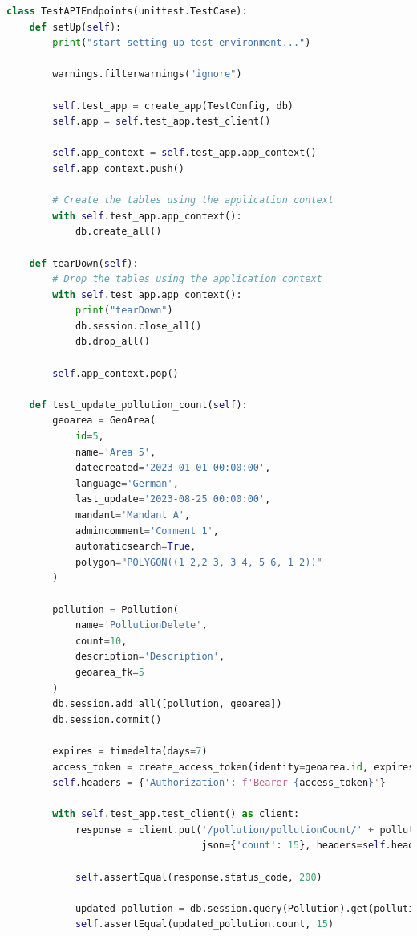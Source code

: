 \documentclass[a4paper,12pt]{article}
\begin{document}
\begin{lstlisting}[language=Python, caption=Implementation der Integrationstests , label=lst:integrationtest]
class TestAPIEndpoints(unittest.TestCase):
    def setUp(self):
        print("start setting up test environment...")

        warnings.filterwarnings("ignore")

        self.test_app = create_app(TestConfig, db)
        self.app = self.test_app.test_client()

        self.app_context = self.test_app.app_context()
        self.app_context.push()

        # Create the tables using the application context
        with self.test_app.app_context():
            db.create_all()

    def tearDown(self):
        # Drop the tables using the application context
        with self.test_app.app_context():
            print("tearDown")
            db.session.close_all()
            db.drop_all()

        self.app_context.pop()

    def test_update_pollution_count(self):
        geoarea = GeoArea(
            id=5,
            name='Area 5',
            datecreated='2023-01-01 00:00:00',
            language='German',
            last_update='2023-08-25 00:00:00',
            mandant='Mandant A',
            admincomment='Comment 1',
            automaticsearch=True,
            polygon="POLYGON((1 2,2 3, 3 4, 5 6, 1 2))"
        )

        pollution = Pollution(
            name='PollutionDelete',
            count=10,
            description='Description',
            geoarea_fk=5
        )
        db.session.add_all([pollution, geoarea])
        db.session.commit()

        expires = timedelta(days=7)
        access_token = create_access_token(identity=geoarea.id, expires_delta=expires)
        self.headers = {'Authorization': f'Bearer {access_token}'}

        with self.test_app.test_client() as client:
            response = client.put('/pollution/pollutionCount/' + pollution.id,
                                  json={'count': 15}, headers=self.headers)

            self.assertEqual(response.status_code, 200)

            updated_pollution = db.session.query(Pollution).get(pollution.id)
            self.assertEqual(updated_pollution.count, 15)
\end{lstlisting}
\end{document}
